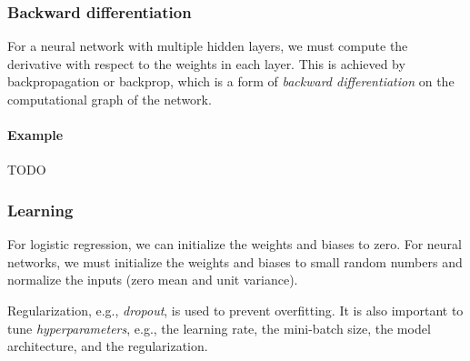 \subsubsection{Backward differentiation}
\label{sec:7:backward-differentiation}

For a neural network with multiple hidden layers, we must compute the
derivative with respect to the weights in each layer.
This is achieved by backpropagation or backprop, which is a form of
\textit{backward differentiation} on the computational graph of the network.

\paragraph{Example}
TODO

\subsubsection{Learning}

For
logistic regression, we can initialize the weights and biases to zero.
For neural networks, we must initialize the weights and biases to small random
numbers and normalize the inputs (zero mean and unit variance).

Regularization, e.g., \textit{dropout}, is used to prevent overfitting.
It is also important to tune \textit{hyperparameters}, e.g., the learning rate,
the mini-batch size, the model architecture, and the regularization.

